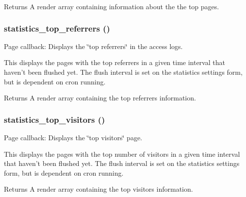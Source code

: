 \begin{DoxyReturn}{Returns}
A render array containing information about the the top pages. 
\end{DoxyReturn}
\hypertarget{statistics_8admin_8inc_a18a38dae66754e711f1d04ec2fe4e3e1}{
\subsubsection[{statistics\_\-top\_\-referrers}]{\setlength{\rightskip}{0pt plus 5cm}statistics\_\-top\_\-referrers ()}}
\label{statistics_8admin_8inc_a18a38dae66754e711f1d04ec2fe4e3e1}
Page callback: Displays the \char`\"{}top referrers\char`\"{} in the access logs.

This displays the pages with the top referrers in a given time interval that haven't been flushed yet. The flush interval is set on the statistics settings form, but is dependent on cron running.

\begin{DoxyReturn}{Returns}
A render array containing the top referrers information. 
\end{DoxyReturn}
\hypertarget{statistics_8admin_8inc_a39dd048ed9a9e6eef337edcbc8ef7501}{
\subsubsection[{statistics\_\-top\_\-visitors}]{\setlength{\rightskip}{0pt plus 5cm}statistics\_\-top\_\-visitors ()}}
\label{statistics_8admin_8inc_a39dd048ed9a9e6eef337edcbc8ef7501}
Page callback: Displays the \char`\"{}top visitors\char`\"{} page.

This displays the pages with the top number of visitors in a given time interval that haven't been flushed yet. The flush interval is set on the statistics settings form, but is dependent on cron running.

\begin{DoxyReturn}{Returns}
A render array containing the top visitors information. 
\end{DoxyReturn}
